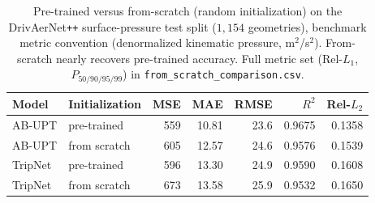 \begin{table}[t]
\centering
\caption{Pre-trained versus from-scratch (random initialization) on the DrivAerNet\texttt{++}
surface-pressure test split ($1{,}154$ geometries), benchmark metric convention (denormalized
kinematic pressure, m$^2$/s$^2$). From-scratch nearly recovers pre-trained accuracy. Full metric
set (Rel-$L_1$, $P_{50/90/95/99}$) in \texttt{from\_scratch\_comparison.csv}.}
\label{tab:from_scratch}
\small
\begin{tabular}{llrrrrr}
\toprule
Model & Initialization & MSE & MAE & RMSE & $R^2$ & Rel-$L_2$ \\
\midrule
AB-UPT  & pre-trained  & 559 & 10.81 & 23.6 & 0.9675 & 0.1358 \\
AB-UPT  & from scratch & 605 & 12.57 & 24.6 & 0.9576 & 0.1539 \\
\midrule
TripNet & pre-trained  & 596 & 13.30 & 24.9 & 0.9590 & 0.1608 \\
TripNet & from scratch & 673 & 13.58 & 25.9 & 0.9532 & 0.1650 \\
\bottomrule
\end{tabular}
\end{table}

